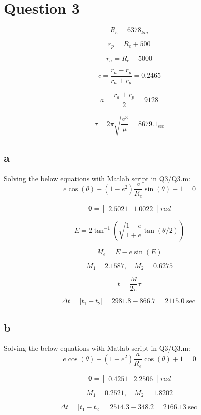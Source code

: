 \section{Question 3}
$$
R_e = 6378_{km}
$$


$$
r_p = R_e + 500
$$

$$
r_a = R_e + 5000
$$

$$
e = 
\dfrac{r_a - r_p}{r_a + r_p} = 0.2465
$$

$$
a = \dfrac{r_a + r_p}{2} = 9128
$$

$$
\tau = 2\pi\sqrt{\dfrac{a^3}{\mu}} = 8679.1_{\sec}
$$
\subsection{a}
Solving the below equations with Matlab script in Q3/Q3.m:
$$
e \cos(\theta) - (1 - e^2) \dfrac{a}{R_e} \sin(\theta) + 1 = 0
$$

$$
\boldsymbol\theta = \begin{bmatrix}
    2.5021 & 1.0022
\end{bmatrix} rad
$$

$$
E = 2 \tan^{-1}\left(\sqrt{\dfrac{1-e}{1+e}}  \tan(\theta/2)\right)
$$

$$
M_e = E - e \sin(E)
$$

$$
M_1 = 2.1587, \quad M_2 = 0.6275
$$

$$
t = \dfrac{M}{2\pi}\tau
$$

$$
\Delta t = \vert t_1 - t_2 \vert = 2981.8 - 866.7 = 2115.0 \sec
$$
\subsection{b}
Solving the below equations with Matlab script in Q3/Q3.m:
$$
e \cos(\theta) - (1 - e^2) \dfrac{a}{R_e} \cos(\theta) + 1 = 0
$$

$$
\boldsymbol\theta = \begin{bmatrix}
    0.4251  &  2.2506
\end{bmatrix} rad
$$

$$
M_1 = 0.2521, \quad M_2 = 1.8202
$$

$$
\Delta t = \vert t_1 - t_2 \vert = 2514.3 - 348.2 = 2166.13 \sec
$$

